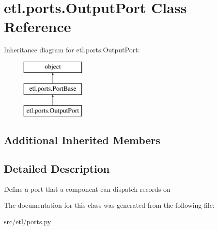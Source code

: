 \hypertarget{classetl_1_1ports_1_1OutputPort}{\section{etl.\-ports.\-Output\-Port Class Reference}
\label{classetl_1_1ports_1_1OutputPort}
}
Inheritance diagram for etl.\-ports.\-Output\-Port\-:\begin{figure}[H]
\begin{center}
\leavevmode
\includegraphics[height=3.000000cm]{classetl_1_1ports_1_1OutputPort}
\end{center}
\end{figure}
\subsection*{Additional Inherited Members}


\subsection{Detailed Description}
\begin{DoxyVerb}Define a port that a component can dispatch records on\end{DoxyVerb}
 

The documentation for this class was generated from the following file\-:\begin{DoxyCompactItemize}
\item 
src/etl/ports.\-py\end{DoxyCompactItemize}

